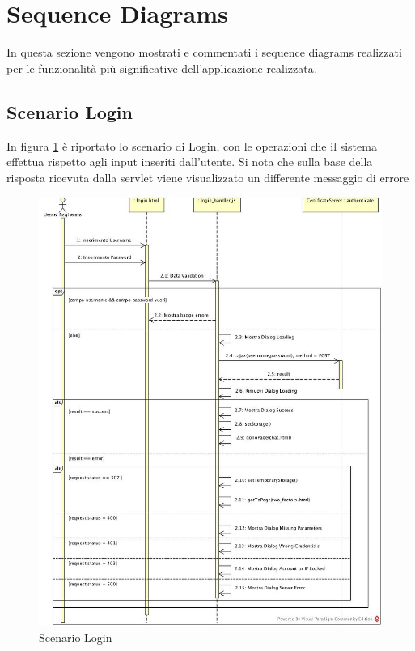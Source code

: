 
\textual
\newpage

\section{Sequence Diagrams}

In questa sezione vengono mostrati e commentati i sequence diagrams realizzati per le funzionalità più significative dell'applicazione realizzata.

\subsection{Scenario Login}

In figura \ref{gfx:sdlogin} è riportato lo scenario di Login, con le operazioni che il sistema effettua rispetto agli input inseriti dall'utente. Si nota che sulla base della risposta ricevuta dalla servlet viene visualizzato un differente messaggio di errore 

\begin{figure}[!htbp]
	\centering
	\includegraphics[scale = .4]{img/sd_login.jpg}
	\caption{Scenario Login}
	\label{gfx:sdlogin}
\end{figure}

